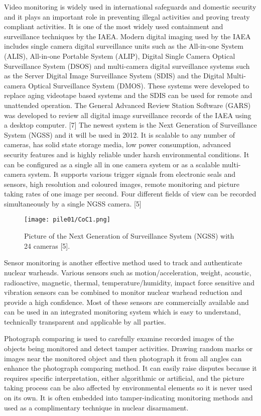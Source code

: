 \documentclass[twocolumn,a4paper]{article}
\begin{document}
Video monitoring is widely used in international safeguards and domestic security and it plays an
important role in preventing illegal activities and proving treaty compliant activities. It is one of the
most widely used containment and surveillance techniques by the IAEA. \citep{wuwen2004} Modern digital imaging
used by the IAEA includes single camera digital surveillance units such as the All-in-one System
(ALIS), All-in-one Portable System (ALIP), Digital Single Camera Optical Surveillance System (DSOS)
and multi-camera digital surveillance systems such as the Server Digital Image Surveillance System
(SDIS) and the Digital Multi-camera Optical Surveillance System (DMOS). These systems were
developed to replace aging videotape based systems and the SDIS can be used for remote and
unattended operation. The General Advanced Review Station Software (GARS) was developed to
review all digital image surveillance records of the IAEA using a desktop computer. [7] The newest
system is the Next Generation of Surveillance System (NGSS) and it will be used in 2012. It is scalable
to any number of cameras, has solid state storage media, low power consumption, advanced
security features and is highly reliable under harsh environmental conditions. It can be configured as
a single all in one camera system or as a scalable multi-camera system. It supports various trigger
signals from electronic seals and sensors, high resolution and coloured images, remote monitoring
and picture taking rates of one image per second. Four different fields of view can be recorded
simultaneously by a single NGSS camera. [5]

\begin{figure}
  \texttt{[image: pile01/CoC1.png]}
  \caption{Picture of the Next Generation of Surveillance System (NGSS) with 24 cameras [5].}
\end{figure}

Sensor monitoring is another effective method used to track and authenticate nuclear warheads.
Various sensors such as motion/acceleration, weight, acoustic, radioactive, magnetic, thermal,
temperature/humidity, impact force sensitive and vibration sensors can be combined to monitor
nuclear warhead reduction and provide a high confidence. Most of these sensors are commercially
available and can be used in an integrated monitoring system which is easy to understand,
technically transparent and applicable by all parties. \citep{wuwen2004}

Photograph comparing is used to carefully examine recorded images of the objects being monitored
and detect tamper activities. Drawing random marks or images near the monitored object and then
photograph it from all angles can enhance the photograph comparing method. It can easily raise
disputes because it requires specific interpretation, either algorithmic or artificial, and the picture
taking process can be also affected by environmental elements so it is never used on its own. It is
often embedded into tamper-indicating monitoring methods and used as a complimentary
technique in nuclear disarmament. \citep{wuwen2004}
\end{document}
